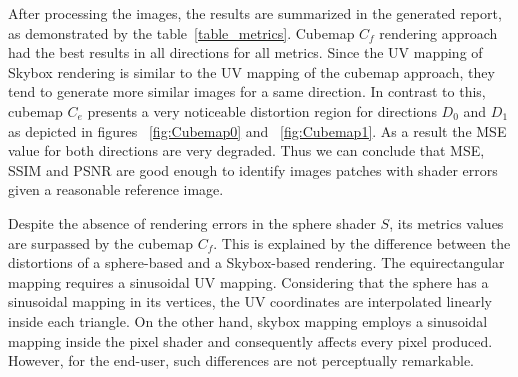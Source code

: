 \documentclass[10pt,conference,pdftex]{IEEEtran}
\begin{document}


After processing the images, the results are summarized in the generated report, as demonstrated by the table~\ref{table_metrics}. Cubemap $C_f$ rendering approach had the best results in all directions for all metrics. Since the UV mapping of Skybox rendering is similar to the UV mapping of the cubemap approach, they tend to generate more similar images for a same direction. In contrast to this, cubemap $C_e$ presents a very noticeable distortion region for directions $D_0$ and $D_1$ as depicted in figures ~\ref{fig:Cubemap0} and ~\ref{fig:Cubemap1}. As a result the MSE value for both directions are very degraded. Thus we can conclude that MSE, SSIM and PSNR are good enough to identify images patches with shader errors given a reasonable reference image.

Despite the absence of rendering errors in the sphere shader $S$, its metrics values are surpassed by the cubemap $C_f$. This is explained by the difference between the distortions of a sphere-based and a Skybox-based rendering. The equirectangular mapping requires a sinusoidal UV mapping. Considering that the sphere has a sinusoidal mapping in its vertices,  the UV coordinates are interpolated linearly inside each triangle. On the other hand, skybox mapping employs a sinusoidal mapping inside the pixel shader and consequently affects every pixel produced. However, for the end-user, such differences are not perceptually remarkable.
\end{document}
